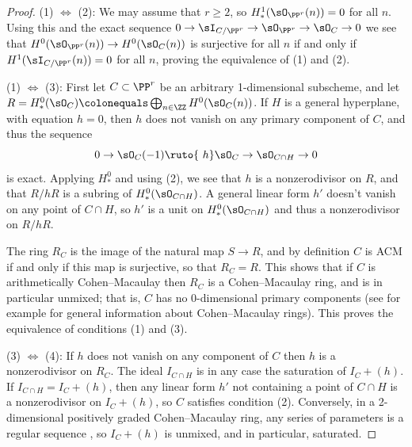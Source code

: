 \begin{proof}
\def\sl#1{(#1)}
\let\rTo\to
\let\Leftrightarrow\iff
{\sl 1} $\Leftrightarrow$ {\sl 2}: We may assume that $r\geq 2$, so $H^1_*(\sO_{\PP^r}(n)) = 0$ for all $n$. Using this and the exact sequence
$
0\rTo \sI_{C/\PP^r}  \rTo  \sO_{\PP^r}  \rTo  \sO_C  \rTo  0
$
we see that $H^0(\sO_{\PP^r}(n)) \to H^0(\sO_C(n))$ is surjective for all $n$ if and only if $H^1(\sI_{C/\PP^r}(n)) = 0$ for all $n$,
proving the equivalence of {\sl 1} and {\sl 2.}

{\sl 1} $\Leftrightarrow$ {\sl 3}: First let $C\subset \PP^r$ be an arbitrary 1-dimensional subscheme,
and let $R =H^0_*(\sO_{C}) \colonequals \bigoplus_{n\in \ZZ} H^0(\sO_{C}(n))$.
If $H$ is a
general hyperplane, with equation $h=0$, then $h$ does not vanish on any primary component of $C$, and thus the sequence
$$
0\rTo \sO_C(-1) \ruto{\ h}\sO_C\rTo \sO_{C\cap H}\rTo 0
$$
is exact. Applying $H^0_*$ and using
(2),
we see that $h$ is a nonzerodivisor on $R$, and that $R/hR$ is
a subring of $H^0_*(\sO_{C\cap H})$.  A general linear form $h'$ doesn't vanish on
any point of $C\cap H$, so $h'$ is a unit on $H^0_*(\sO_{C\cap H})$
and thus a nonzerodivisor on $R/hR$.

The ring $R_C$ is the image of the natural map $S\to R$, and by definition $C$ is ACM if and only if this map is surjective,
so that $R_C = R$. This shows that if $C$ is arithmetically Cohen--Macaulay then $R_C$ is a Cohen--Macaulay ring,
and is in particular unmixed; that is, $C$ has no 0-dimensional primary components (see for example \cite[Chapter 18]{Eisenbud1995} for general
information about Cohen--Macaulay rings). This proves the equivalence of conditions {\sl 1} and {\sl 3.}


{\sl 3} $\Leftrightarrow$ {\sl 4}: If  $h$ does not vanish on any component of $C$ then $h$ is a nonzerodivisor on $R_C$. The ideal $I_{C\cap H}$ is in any case the saturation of $I_C+(h)$.
If $I_{C\cap H}=I_C+(h)$, then any linear form $h'$ not containing a point of $C\cap H$ is a nonzerodivisor
on $I_C+(h)$, so $C$ satisfies condition {\sl 2}. Conversely, in a 2-dimensional positively graded Cohen--Macaulay ring, any
series of parameters is a regular sequence \cite[Section 18.2]{Eisenbud1995}, so $I_C+(h)$ is unmixed, and in particular, saturated.
\end{proof}

